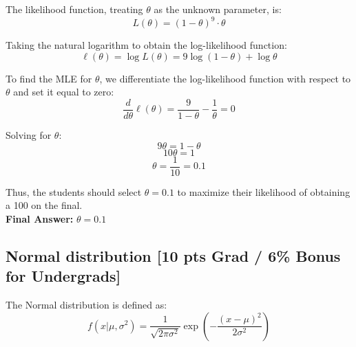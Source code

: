 \documentclass{article}
\begin{document}
The likelihood function, treating $\theta$ as the unknown parameter, is:
\[
    L(\theta) = (1 - \theta)^9 \cdot \theta
\]

Taking the natural logarithm to obtain the log-likelihood function:
\[
    \ell(\theta) = \log L(\theta) = 9\log(1 - \theta) + \log \theta
\]

To find the MLE for $\theta$, we differentiate the log-likelihood function with respect to $\theta$ and set it equal to zero:
\[
    \frac{d}{d\theta} \ell(\theta) = \frac{9}{1 - \theta} - \frac{1}{\theta} = 0
\]

Solving for $\theta$:
\[
    9\theta = 1 - \theta
\]
\[
    10\theta = 1
\]
\[
    \theta = \frac{1}{10} = 0.1
\]

Thus, the students should select $\theta = 0.1$ to maximize their likelihood of obtaining a 100 on the final. \\

\textbf{Final Answer:} $\theta = 0.1$

\newpage

\subsection{Normal distribution [10 pts Grad / 6\% Bonus for Undergrads]}
The Normal distribution is defined as:
 $$f(x| \mu, \sigma^2) = \frac{1}{\sqrt{2\pi \sigma^2}} \exp\left(-\frac{(x - \mu)^2}{2\sigma^2}\right)$$
 
\end{document}
